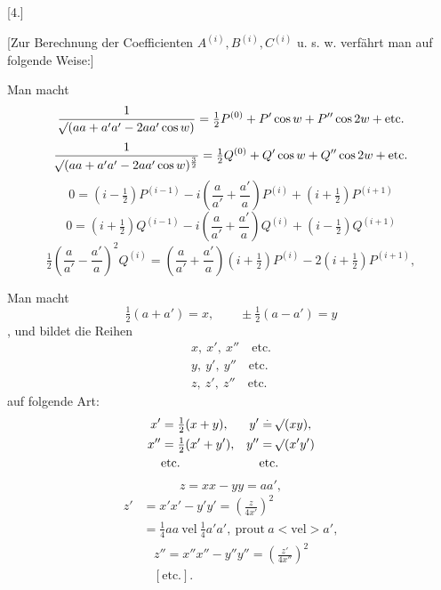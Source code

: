 \par\bigskip
\hypertarget{native-390}{}
\begin{center}[4.]\end{center}
\noindent\hspace*{\parindent}[Zur Berechnung der Coefficienten \(A^{(i)}, B^{(i)}, C^{(i)}\) u. s. w. verfährt man auf folgende Weise:]

Man macht
\[
\frac{1}{\mathord{{}^{}\!\surd}(aa+a'a'-2aa'\cos w)}=\tfrac12P^{(0)}+P'\cos w+P''\cos2w+\text{etc.}
\]
\[
\frac{1}{\mathord{{}^{}\!\surd}(aa+a'a'-2aa'\cos w)^{\frac32}}=\tfrac12Q^{(0)}+Q'\cos w+Q''\cos2w+\text{etc.}
\]
\[
0=(i-\tfrac12)P^{(i-1)}-i\left(\frac a{a'}+\frac{a'}a\right)P^{(i)}+(i+\tfrac12)P^{(i+1)}
\]
\[
0=(i+\tfrac12)Q^{(i-1)}-i\left(\frac a{a'}+\frac{a'}a\right)Q^{(i)}+(i-\tfrac12)Q^{(i+1)}
\]
\[
\tfrac12\left(\frac a{a'}-\frac{a'}a\right)^2Q^{(i)}=\left(\frac a{a'}+\frac{a'}a\right)(i+\tfrac12)P^{(i)}-2(i+\tfrac12)P^{(i+1)},
\]

Man macht
\[
\tfrac12(a+a')=x,\qquad\pm\tfrac12(a-a')=y
\]
, und bildet die Reihen
\[
\begin{gathered}
x,\ x',\ x''\quad\text{etc.}\\
y,\ y',\ y''\quad\text{etc.}\\
z,\ z',\ z''\quad\text{etc.}
\end{gathered}
\]
\noindent auf folgende Art:
\[
\begin{aligned}
x'&=\tfrac12(x+y),&y'&\overset{\scriptscriptstyle\boldsymbol{.}}{=}\mathord{{}^{}\!\surd}(xy),\\
x''&=\tfrac12(x'+y'),&y''&=\mathord{{}^{}\!\surd}(x'y')\\
&\text{etc.}&&\text{etc.}
\end{aligned}
\]
\[
z=xx-yy=aa',
\]
\[
\begin{aligned}
z'&=x'x'-y'y'=\left(\frac z{4x'}\right)^2\\
&=\tfrac14aa\ \text{vel}\ \tfrac14a'a',\ \text{prout}\ a<\text{vel}>a',
\end{aligned}
\]
\[
\begin{gathered}
z''=x''x''-y''y''=\left(\frac{z'}{4x''}\right)^2\\
[\text{etc.}].
\end{gathered}
\]

